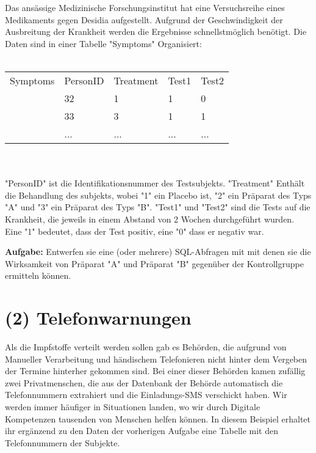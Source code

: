 \documentclass[]{article}
\begin{document}
Das ansässige Medizinische Forschungsinstitut hat eine Versuchsreihe eines Medikaments gegen Desidia aufgestellt. Aufgrund der Geschwindigkeit der Ausbreitung der Krankheit werden die Ergebnisse schnellstmöglich benötigt. 
Die Daten sind in einer Tabelle "Symptoms" Organisiert:\\\ \\

\begin{tabular}{lllll}
\multicolumn{1}{l|}{Symptoms} & \multicolumn{1}{l|}{PersonID} & \multicolumn{1}{l|}{Treatment} & \multicolumn{1}{l|}{Test1} & \multicolumn{1}{l|}{Test2} \\ \cline{2-5} 
                              & 32                            & 1                              & 1                          & 0                          \\
                              & 33                            & 3                              & 1                          & 1                          \\
                              & ...                           & ...                            & ...                        & ...                       
\end{tabular}\\\ \\

"PersonID" ist die Identifikationsnummer des Testsubjekts. "Treatment" Enthält die Behandlung des subjekts, wobei "1" ein Placebo ist, "2" ein Präparat des Typs "A" und "3" ein Präparat des Typs "B". "Test1" und "Test2" sind die Tests auf die Krankheit, die jeweils in einem Abstand von 2 Wochen durchgeführt wurden. Eine "1" bedeutet, dass der Test positiv, eine "0" dass er negativ war. 

\textbf{Aufgabe:} Entwerfen sie eine (oder mehrere) SQL-Abfragen mit mit denen sie die Wirksamkeit von Präparat "A" und Präparat "B" gegenüber der Kontrollgruppe ermitteln können.



\newpage

\section*{(2) Telefonwarnungen}

Als die Impfstoffe verteilt werden sollen gab es Behörden, die aufgrund von Manueller Verarbeitung und händischem Telefonieren nicht hinter dem Vergeben der Termine hinterher gekommen sind. Bei einer dieser Behörden kamen zufällig zwei Privatmenschen, die aus der Datenbank der Behörde automatisch die Telefonnummern extrahiert und die Einladungs-SMS verschickt haben. Wir werden immer häufiger in Situationen landen, wo wir durch Digitale Kompetenzen tausenden von Menschen helfen können. In diesem Beispiel erhaltet ihr ergänzend zu den Daten der vorherigen Aufgabe eine Tabelle mit den Telefonnummern der Subjekte. \\\ \\
\end{document}
